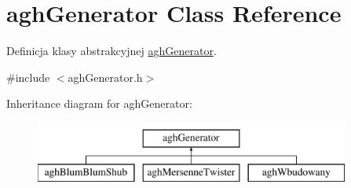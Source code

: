 \hypertarget{classaghGenerator}{\section{agh\-Generator \-Class \-Reference}
\label{classaghGenerator}
}


\-Definicja klasy abstrakcyjnej \hyperlink{classaghGenerator}{agh\-Generator}.  




{\ttfamily \#include $<$agh\-Generator.\-h$>$}

\-Inheritance diagram for agh\-Generator\-:\begin{figure}[H]
\begin{center}
\leavevmode
\includegraphics[height=2.000000cm]{classaghGenerator}
\end{center}
\end{figure}
